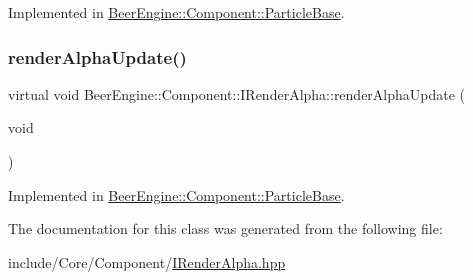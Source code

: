 Implemented in \mbox{\hyperlink{class_beer_engine_1_1_component_1_1_particle_base_ab891afa6a5b2c99ffe94691bb5419588}{Beer\+Engine\+::\+Component\+::\+Particle\+Base}}.

\mbox{\label{class_beer_engine_1_1_component_1_1_i_render_alpha_ad0fd47a02cc63152b25dbfdb4b2639fa}} 
\subsubsection{\texorpdfstring{render\+Alpha\+Update()}{renderAlphaUpdate()}}
{\footnotesize\ttfamily virtual void Beer\+Engine\+::\+Component\+::\+I\+Render\+Alpha\+::render\+Alpha\+Update (\begin{DoxyParamCaption}\item[{void}]{ }\end{DoxyParamCaption})\hspace{0.3cm}{\ttfamily [pure virtual]}}



Implemented in \mbox{\hyperlink{class_beer_engine_1_1_component_1_1_particle_base_a0cecaefb92ed219eb0ddc2771c513446}{Beer\+Engine\+::\+Component\+::\+Particle\+Base}}.



The documentation for this class was generated from the following file\+:\begin{DoxyCompactItemize}
\item 
include/\+Core/\+Component/\mbox{\hyperlink{_i_render_alpha_8hpp}{I\+Render\+Alpha.\+hpp}}\end{DoxyCompactItemize}
